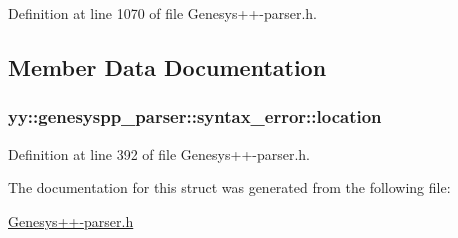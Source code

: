 Definition at line 1070 of file Genesys++-\/parser.\-h.



\subsection{Member Data Documentation}
\hypertarget{structyy_1_1genesyspp__parser_1_1syntax__error_a87825033c536031c1ef07b33f472e5a7}{
\subsubsection[{location}]{ yy\-::genesyspp\-\_\-parser\-::syntax\-\_\-error\-::location}}\label{structyy_1_1genesyspp__parser_1_1syntax__error_a87825033c536031c1ef07b33f472e5a7}


Definition at line 392 of file Genesys++-\/parser.\-h.



The documentation for this struct was generated from the following file\-:\begin{DoxyCompactItemize}
\item 
\hyperlink{_genesys_09_09-parser_8h}{Genesys++-\/parser.\-h}\end{DoxyCompactItemize}
